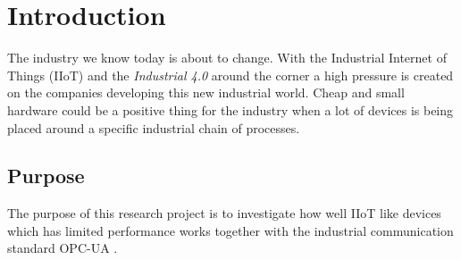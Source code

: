 \section{Introduction}
The industry we know today is about to change. With the Industrial Internet of Things (IIoT) and the \textit{Industrial 4.0} around the corner a high pressure is created on the companies developing this new industrial world. Cheap and small hardware could be a positive thing for the industry when a lot of devices is being placed around a specific industrial chain of processes.

\subsection{Purpose}
The purpose of this research project is to investigate how well IIoT like devices which has limited performance works together with the industrial communication standard OPC-UA \cite{opcfoundation}.

